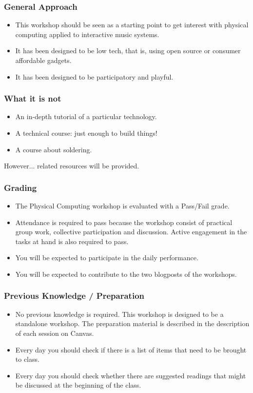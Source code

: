 \documentclass[screen, aspectratio=169]{beamer}
\begin{document}
%
\begin{frame}
\frametitle{General Approach}
\begin{itemize}
\item This workshop should be seen as a starting point to get interest with physical computing applied to interactive music systems.
\item It has been designed to be low tech, that is, using open source or consumer affordable gadgets.
\item It has been designed to be participatory and playful.
\end{itemize}
\end{frame}
%
\begin{frame}
\frametitle{What it is not}
\begin{itemize}
\item An in-depth tutorial of a particular technology.
\item A technical course: just enough to build things!
\item A course about soldering.
\end{itemize}
However... related resources will be provided.
\end{frame}
%
\begin{frame}
\frametitle{Grading}
\begin{itemize}
\item The Physical Computing workshop is evaluated with a Pass/Fail grade.
\item Attendance is required to pass because the workshop consist of practical group work, collective participation and discussion. Active engagement in the tasks at hand is also required to pass. 
\item You will be expected to participate in the daily performance.
\item You will be expected to contribute to the two blogposts of the workshops.
\end{itemize}
\end{frame}
%
\begin{frame}
\frametitle{Previous Knowledge / Preparation}
\begin{itemize}
\item No previous knowledge is required. This workshop is designed to be a standalone workshop. The preparation material is described in the description of each session on Canvas.
\item Every day you should check if there is a list of items that need to be brought to class.
\item Every day you should check whether there are suggested readings that might be discussed at the beginning of the class.
\end{itemize}
\end{frame}
\end{document}
